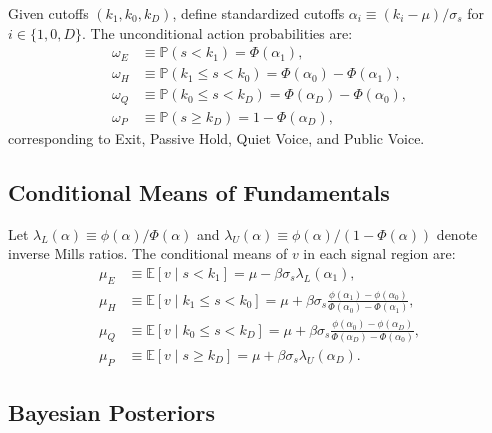 \documentclass[11pt]{article}
\newcommand{\E}{\mathbb{E}}
\newcommand{\PP}{\mathbb{P}}
\newcommand{\1}{\mathbf{1}}
\begin{document}
Given cutoffs $(k_1, k_0, k_D)$, define standardized cutoffs $\alpha_i \equiv (k_i - \mu)/\sigma_s$ for $i \in \{1, 0, D\}$. The unconditional action probabilities are:
\begin{align*}
\omega_E &\equiv \PP(s < k_1) = \Phi(\alpha_1), \\
\omega_H &\equiv \PP(k_1 \leq s < k_0) = \Phi(\alpha_0) - \Phi(\alpha_1), \\
\omega_Q &\equiv \PP(k_0 \leq s < k_D) = \Phi(\alpha_D) - \Phi(\alpha_0), \\
\omega_P &\equiv \PP(s \geq k_D) = 1 - \Phi(\alpha_D),
\end{align*}
corresponding to Exit, Passive Hold, Quiet Voice, and Public Voice.

\subsection{Conditional Means of Fundamentals}

Let $\lambda_L(\alpha) \equiv \phi(\alpha)/\Phi(\alpha)$ and $\lambda_U(\alpha) \equiv \phi(\alpha)/(1-\Phi(\alpha))$ denote inverse Mills ratios. The conditional means of $v$ in each signal region are:
\begin{align*}
\mu_E &\equiv \E[v \mid s < k_1] = \mu - \beta\sigma_s \lambda_L(\alpha_1), \\
\mu_H &\equiv \E[v \mid k_1 \leq s < k_0] = \mu + \beta\sigma_s \frac{\phi(\alpha_1) - \phi(\alpha_0)}{\Phi(\alpha_0) - \Phi(\alpha_1)}, \\
\mu_Q &\equiv \E[v \mid k_0 \leq s < k_D] = \mu + \beta\sigma_s \frac{\phi(\alpha_0) - \phi(\alpha_D)}{\Phi(\alpha_D) - \Phi(\alpha_0)}, \\
\mu_P &\equiv \E[v \mid s \geq k_D] = \mu + \beta\sigma_s \lambda_U(\alpha_D).
\end{align*}

\subsection{Bayesian Posteriors}
\end{document}

